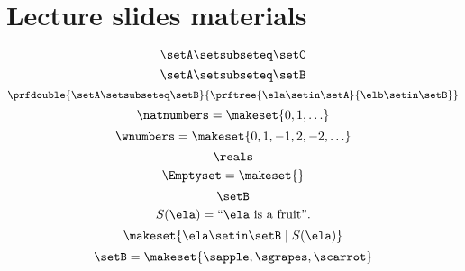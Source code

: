 
\section{Lecture slides materials}

\begin{forslides}
    \begin{equation}
        \label{eq:subset_session1_testing_22}
        \setA \setsubseteq \setC
    \end{equation}
    \begin{equation}
        \label{eq:subset_session1_22}
        \setA \setsubseteq \setB
    \end{equation}
    \begin{equation}
        \label{eq:subset_2_session1_22}
        \prfdouble{
            \setA \setsubseteq \setB}{\prftree{\ela \setin \setA}{\elb \setin \setB}}
    \end{equation}
    \begin{equation}
        \label{eq:nats_session1_22}
        \natnumbers =\makeset{0,1,\ldots}
    \end{equation}
    \begin{equation}
        \label{eq:reals_session1_22}
        \wnumbers =\makeset{0,1,-1,2,-2,\ldots}
    \end{equation}
    \begin{equation}
        \label{eq:reals_2_session1_22}
        \reals
    \end{equation}
    \begin{equation}
        \label{eq:emptyset_session1_22}
        \Emptyset=\makeset{}
    \end{equation}
    \begin{equation}
        \label{eq:stat_1_session1_22}
        \setB
    \end{equation}
    \begin{equation}
        \label{eq:stat_2_session1_22}
        S(\ela) = \text{``$\ela$ is a fruit''}.
    \end{equation}
    \begin{equation}
        \label{eq:stat_3_session1_22}
        \makeset{\ela \setin \setB \mid S(\ela)}
    \end{equation}
    \begin{equation}
        \label{eq:stat_4_session1_22}
        \setB=\makeset{\sapple, \sgrapes, \scarrot}
    \end{equation}
    \begin{equation}

\end{equation}
\end{forslides}
